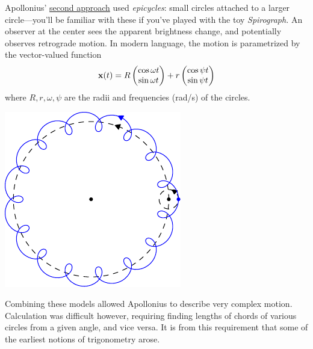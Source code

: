 \begin{minipage}[t]{0.68\linewidth}\vspace{0pt}
	Apollonius' \href{http://brunelleschi.imss.fi.it/galileopalazzostrozzi/multimedia/ApolloniusEpicycles.html}{second approach} used \emph{epicycles}: small circles attached to a larger circle---you'll be familiar with these if you've played with the toy \emph{Spirograph.} An observer at the center sees the apparent brightness change, and potentially observes retrograde motion. In modern language, the motion is parametrized by the vector-valued function
	\[
		{\mathbf{x}}(t)=R\begin{pmatrix}\cos \omega t\\\sin \omega t\end{pmatrix}+r\begin{pmatrix}\cos \psi t\\\sin \psi t\end{pmatrix}
	\]
	where $R,r,\omega,\psi$ are the radii and frequencies (rad/s) of the circles.
\end{minipage}
\hfill
\begin{minipage}[t]{0.31\linewidth}\vspace{0pt}
  \flushright\includegraphics{trig-epicycle1}
\end{minipage}
\medbreak
  
Combining these models allowed Apollonius to describe very complex motion. Calculation was difficult however, requiring finding lengths of chords of various circles from a given angle, and vice versa. It is from this requirement that some of the earliest notions of trigonometry arose.\medbreak
 
